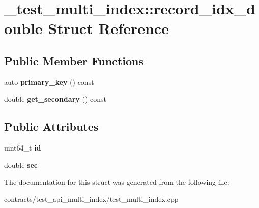 \hypertarget{struct__test__multi__index_1_1record__idx__double}{}\section{\+\_\+test\+\_\+multi\+\_\+index\+:\+:record\+\_\+idx\+\_\+double Struct Reference}
\label{struct__test__multi__index_1_1record__idx__double}
\subsection*{Public Member Functions}
\begin{DoxyCompactItemize}
\item 
\mbox{\label{struct__test__multi__index_1_1record__idx__double_a972779c01e0650b1f5ef914809c60970}} 
auto {\bfseries primary\+\_\+key} () const
\item 
\mbox{\label{struct__test__multi__index_1_1record__idx__double_a14fddce4487244026470ba89c352005c}} 
double {\bfseries get\+\_\+secondary} () const
\end{DoxyCompactItemize}
\subsection*{Public Attributes}
\begin{DoxyCompactItemize}
\item 
\mbox{\label{struct__test__multi__index_1_1record__idx__double_ae47d0b1dad7940434778ac4ce0d1a1f5}} 
uint64\+\_\+t {\bfseries id}
\item 
\mbox{\label{struct__test__multi__index_1_1record__idx__double_aab7348e8d9e330eb9060d3d843afcc92}} 
double {\bfseries sec}
\end{DoxyCompactItemize}


The documentation for this struct was generated from the following file\+:\begin{DoxyCompactItemize}
\item 
contracts/test\+\_\+api\+\_\+multi\+\_\+index/test\+\_\+multi\+\_\+index.\+cpp\end{DoxyCompactItemize}
